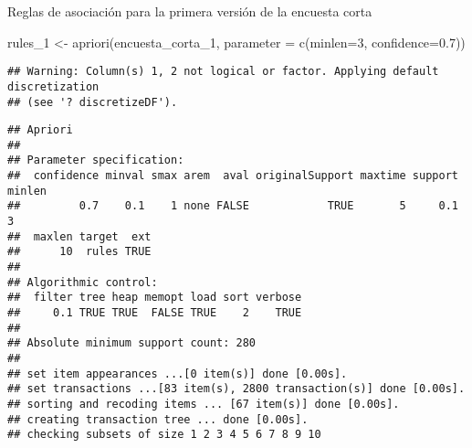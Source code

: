 \documentclass[
]{article}
\newenvironment{Shaded}{\begin{snugshade}}{\end{snugshade}}
\newcommand{\AttributeTok}[1]{\textcolor[rgb]{0.77,0.63,0.00}{#1}}
\newcommand{\DecValTok}[1]{\textcolor[rgb]{0.00,0.00,0.81}{#1}}
\newcommand{\FloatTok}[1]{\textcolor[rgb]{0.00,0.00,0.81}{#1}}
\newcommand{\FunctionTok}[1]{\textcolor[rgb]{0.00,0.00,0.00}{#1}}
\newcommand{\NormalTok}[1]{#1}
\newcommand{\OtherTok}[1]{\textcolor[rgb]{0.56,0.35,0.01}{#1}}
\newcommand{\SpecialCharTok}[1]{\textcolor[rgb]{0.00,0.00,0.00}{#1}}
\begin{document}
\begin{Shaded}
\end{Shaded}

Reglas de asociación para la primera versión de la encuesta corta

\begin{Shaded}
\begin{Highlighting}[]
\NormalTok{rules\_1 }\OtherTok{\textless{}{-}} \FunctionTok{apriori}\NormalTok{(encuesta\_corta\_1, }\AttributeTok{parameter =} \FunctionTok{c}\NormalTok{(}\AttributeTok{minlen=}\DecValTok{3}\NormalTok{, }\AttributeTok{confidence=}\FloatTok{0.7}\NormalTok{))}
\end{Highlighting}
\end{Shaded}

\begin{verbatim}
## Warning: Column(s) 1, 2 not logical or factor. Applying default discretization
## (see '? discretizeDF').
\end{verbatim}

\begin{verbatim}
## Apriori
## 
## Parameter specification:
##  confidence minval smax arem  aval originalSupport maxtime support minlen
##         0.7    0.1    1 none FALSE            TRUE       5     0.1      3
##  maxlen target  ext
##      10  rules TRUE
## 
## Algorithmic control:
##  filter tree heap memopt load sort verbose
##     0.1 TRUE TRUE  FALSE TRUE    2    TRUE
## 
## Absolute minimum support count: 280 
## 
## set item appearances ...[0 item(s)] done [0.00s].
## set transactions ...[83 item(s), 2800 transaction(s)] done [0.00s].
## sorting and recoding items ... [67 item(s)] done [0.00s].
## creating transaction tree ... done [0.00s].
## checking subsets of size 1 2 3 4 5 6 7 8 9 10
\end{verbatim}
\end{document}
